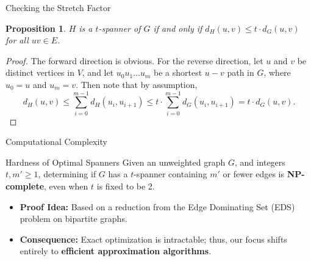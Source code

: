 \documentclass{beamer}
\newtheorem{proposition}[theorem]{Proposition}
\begin{document}
\begin{frame}{Checking the Stretch Factor}
    \begin{proposition}
        $H$ is a $t$-spanner of $G$ if and only if $d_H(u, v) \le t \cdot d_G(u, v)$ for all $uv \in E$.
    \end{proposition}
    \begin{proof}
        The forward direction is obvious. For the reverse direction, let $u$ and $v$ be distinct vertices in $V$, and let $u_0u_1 \dots u_m$ be a shortest $u-v$ path in $G$, where $u_0 = u$ and $u_m = v$. Then note that by assumption,
        \[ d_H(u, v) \le \sum_{i=0}^{m-1} d_H(u_i, u_{i+1}) \le t \cdot \sum_{i=0}^{m-1} d_G(u_i, u_{i+1}) = t \cdot d_G(u,v). \]
    \end{proof}
\end{frame}

\begin{frame}{Computational Complexity}
    \begin{block}{Hardness of Optimal Spanners}
        Given an unweighted graph $G$, and integers $t, m' \ge 1$, determining if $G$ has a $t$-spanner containing $m'$ or fewer edges is \textbf{NP-complete}, even when $t$ is fixed to be 2.
    \end{block}
    
    \vspace{0.6cm}
    \begin{itemize}
        \item \textbf{Proof Idea:} Based on a reduction from the Edge Dominating Set (EDS) problem on bipartite graphs.
        \vspace{0.2cm}
        \item \textbf{Consequence:} Exact optimization is intractable; thus, our focus shifts entirely to \textbf{efficient approximation algorithms}.
    \end{itemize}
\end{frame}
\end{document}
